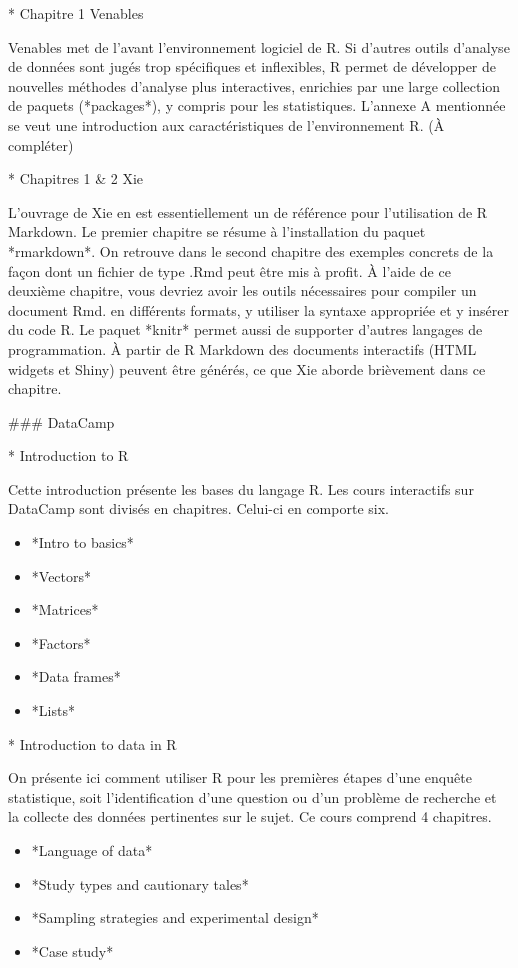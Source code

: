 \documentclass[
  letterpaper,
]{scrbook}
\begin{document}
* Chapitre 1 Venables

Venables met de l'avant l'environnement logiciel de R. Si d'autres
outils d'analyse de données sont jugés trop spécifiques et inflexibles,
R permet de développer de nouvelles méthodes d'analyse plus
interactives, enrichies par une large collection de paquets
(*packages*), y compris pour les statistiques. L'annexe A mentionnée se
veut une introduction aux caractéristiques de l'environnement R. (À
compléter)

* Chapitres 1 \& 2 Xie

L'ouvrage de Xie en est essentiellement un de référence pour
l'utilisation de R Markdown. Le premier chapitre se résume à
l'installation du paquet *rmarkdown*. On retrouve dans le second
chapitre des exemples concrets de la façon dont un fichier de type .Rmd
peut être mis à profit. À l'aide de ce deuxième chapitre, vous devriez
avoir les outils nécessaires pour compiler un document Rmd. en
différents formats, y utiliser la syntaxe appropriée et y insérer du
code R. Le paquet *knitr* permet aussi de supporter d'autres langages de
programmation. À partir de R Markdown des documents interactifs (HTML
widgets et Shiny) peuvent être générés, ce que Xie aborde brièvement
dans ce chapitre.

\#\#\# DataCamp

* Introduction to R

Cette introduction présente les bases du langage R. Les cours
interactifs sur DataCamp sont divisés en chapitres. Celui-ci en comporte
six.

\begin{itemize}
\item
  *Intro to basics*
\item
  *Vectors*
\item
  *Matrices*
\item
  *Factors*
\item
  *Data frames*
\item
  *Lists*
\end{itemize}

* Introduction to data in R

On présente ici comment utiliser R pour les premières étapes d'une
enquête statistique, soit l'identification d'une question ou d'un
problème de recherche et la collecte des données pertinentes sur le
sujet. Ce cours comprend 4 chapitres.

\begin{itemize}
\item
  *Language of data*
\item
  *Study types and cautionary tales*
\item
  *Sampling strategies and experimental design*
\item
  *Case study*
\end{itemize}
\end{document}
